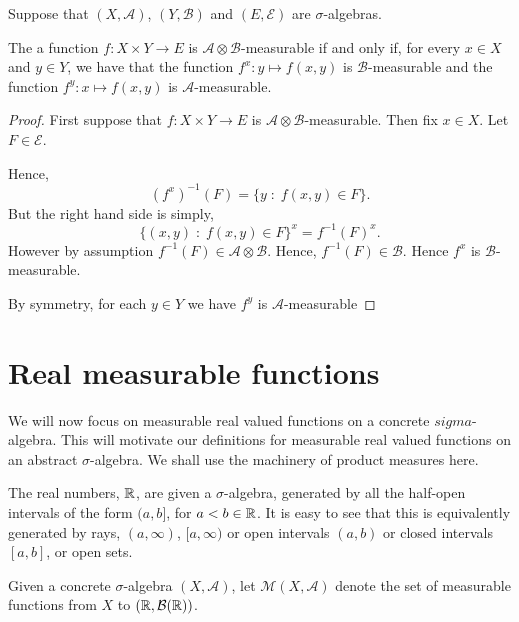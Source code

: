 \documentclass{owmaths}
\begin{document}
\begin{proposition}
    Suppose that $(X,\mathcal{A})$, $(Y,\mathcal{B})$ and $(E,\mathcal{E})$
    are $\sigma$-algebras.
    
    The a function $f:X\times Y\rightarrow E$ is $\mathcal{A}\otimes \mathcal{B}$-measurable
    if and only if, for every $x \in X$ and $y \in Y$, we have that
    the function $f^x:y\mapsto f(x,y)$ is $\mathcal{B}$-measurable
    and the function $f^y:x\mapsto f(x,y)$ is $\mathcal{A}$-measurable.
\end{proposition}
\begin{proof}
    First suppose that $f:X\times Y\rightarrow E$
    is $\mathcal{A}\otimes \mathcal{B}$-measurable. Then fix $x \in X$. Let $F \in \mathcal{E}$.
    
    Hence,
    \begin{equation*}
        (f^x)^{-1}(F) = \{y\;:\;f(x,y) \in F\}.
    \end{equation*}
    But the right hand side is simply,
    \begin{equation*}
        \{(x,y)\;:\;f(x,y) \in F\}^x = f^{-1}(F)^x.
    \end{equation*}
    However by assumption $f^{-1}(F) \in \mathcal{A}\otimes\mathcal{B}$. 
    Hence, $f^{-1}(F) \in \mathcal{B}$. Hence $f^x$ is $\mathcal{B}$-measurable.
    
    By symmetry, for each $y \in Y$ we have $f^y$ is $\mathcal{A}$-measurable
    
    
    
\end{proof}
\section{Real measurable functions}
We will now focus on measurable real valued functions on a concrete $sigma$-algebra.
This will motivate our definitions for measurable real valued functions
on an abstract $\sigma$-algebra. We shall use the machinery of product measures
here. 

The real numbers, $\mathbb{R}$, are given a $\sigma$-algebra, generated
by all the half-open intervals of the form $(a,b]$, for $a < b \in \mathbb{R}$. It is
easy to see that this is equivalently generated by rays, $(a,\infty)$, $[a,\infty)$
or open intervals $(a,b)$ or closed intervals $[a,b]$, or open sets.

Given a concrete $\sigma$-algebra $(X,\mathcal{A})$, let $\mathcal{M}(X,\mathcal{A})$
denote the set of measurable functions from $X$ to $(\mathbb{R},\mathcal{B}(\mathbb{R}))$.
\end{document}
